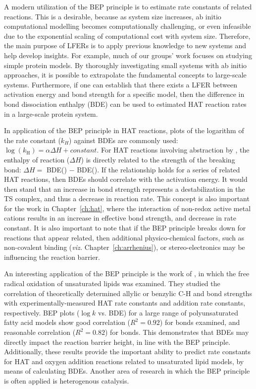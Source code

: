 A modern utilization of the BEP principle is to estimate rate constants of related reactions. This is a desirable, because as system size increases, ab initio computational modelling becomes computationally challenging, or even infeasible due to the exponential scaling of computational cost with system size. Therefore, the main purpose of LFERs is to apply previous knowledge to new systems and help develop insights. For example, much of our groups' work focuses on studying simple protein models. By thoroughly investigating small systems with ab initio approaches, it is possible to extrapolate the fundamental concepts to large-scale systems. Furthermore, if one can establish that there exists a LFER between activation energy and bond strength for a specific model, then the difference in bond dissociation enthalpy (BDE) can be used to estimated HAT reaction rates in a large-scale protein system.

In application of the BEP principle in HAT reactions, plots of the logarithm of the rate constant ($k_H$) against BDEs are commonly used: $\log(k_\mathrm{H}) = \alpha \Delta H + constant$. For HAT reactions involving abstraction by \cumo, the enthalpy of reaction ($\Delta H$) is directly related to the strength of the breaking bond: $\Delta H =$ BDE() $-$ BDE(). If the relationship holds for a series of related HAT reactions, then BDEs should correlate with the activation energy. It would then stand that an increase in bond strength represents a destabilization in the TS complex, and thus a decrease in reaction rate. This concept is also important for the work in Chapter~\ref{ch:hat}, where the interaction of non-redox active metal cations results in an increase in effective bond strength, and decrease in rate constant. It is also important to note that if the BEP principle breaks down for reactions that appear related, then additional physico-chemical factors, such as non-covalent binding (\emph{viz.} Chapter~\ref{ch:arrhenius}), or stereo-electronics may be influencing the reaction barrier.

An interesting application of the BEP principle is the work of \citet{Pratt2003}, in which the free radical oxidation of unsaturated lipids was examined. They studied the correlation of theoretically determined allylic or benzylic C-H and  bond strengths with experimentally-measured HAT rate constants and  addition rate constants, respectively. BEP plots ($\log k$ vs. BDE) for a large range of polyunsaturated fatty acid models show good correlation ($R^2 = 0.92$) for  bonds examined, and reasonable correlation ($R^2 = 0.82$) for  bonds. This demonstrates that BDEs may directly impact the reaction barrier height, in line with the BEP principle. Additionally, these results provide the important ability to predict rate constants for HAT and oxygen addition reactions related to unsaturated lipid models, by means of calculating BDEs. Another area of research in which the BEP principle is often applied is heterogenous catalysis.\cite{Panov2015}


